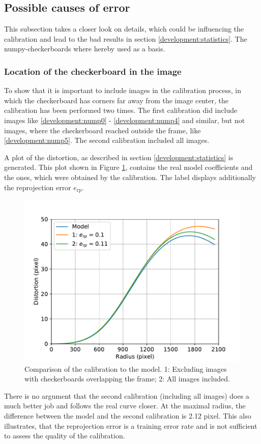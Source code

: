 \newpage
\subsection{Possible causes of error}
This subsection takes a closer look on details, which could be influencing the calibration and lead to the bad results in section \ref{development:statistics}.
The numpy-checkerboards where hereby used as a basis.

\subsubsection{Location of the checkerboard in the image}
To show that it is important to include images in the calibration process, in which the checkerboard has corners far away from the image center, the calibration has been performed two times.
The first calibration did include images like \ref{development:nump0} - \ref{development:nump4} and similar, but not images, where the checkerboard reached outside the frame, like \ref{development:nump5}.
The second calibration included all images.

A plot of the distortion, as described in section \ref{development:statistics} is generated.
This plot shown in Figure \ref{development:loc}, contains the real model coefficients and the ones, which were obtained by the calibration.
The label displays additionally the reprojection error $e_{\text{rp}}$.
\begin{figure}
	\centering
	\includegraphics[width=0.9\linewidth]{3-development/calibration/images/location.pdf}
	\caption{Comparison of the calibration to the model. 1: Excluding images with checkerboards overlapping the frame; 2: All images included. \label{development:loc}}
\end{figure}
There is no argument that the second calibration (including all images) does a much better job and follows the real curve closer.
At the maximal radius, the difference between the model and the second calibration is 2.12 pixel.
This also illustrates, that the reprojection error is a training error rate and is not sufficient to assess the quality of the calibration.

